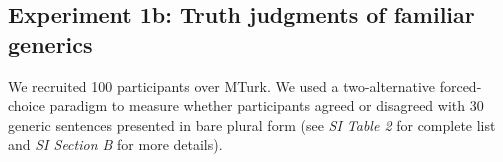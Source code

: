 \documentclass{pnastwo}
\begin{document}
\begin{article}
\begin{materials}
\subsection{Experiment 1b: Truth judgments of familiar generics}
We recruited 100 participants over MTurk.  
We used a two-alternative forced-choice paradigm to measure whether participants agreed or disagreed with 30 generic sentences presented in bare plural form (see {\it SI Table 2} for complete list and {\it SI Section B} for more details). 
%


\end{materials}
\end{article}
\end{document}

